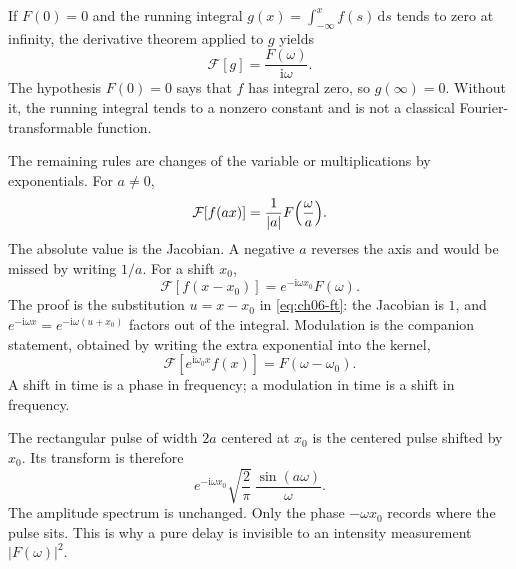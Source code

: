 If $F(0)=0$ and the running integral $g(x)=\int_{-\infty}^{x}f(s)\,\mathrm{d}s$ tends to zero at infinity, the derivative theorem applied to $g$ yields
\begin{equation}
\mathcal{F}[g]=\frac{F(\omega)}{\mathrm{i}\omega}.
\end{equation}
The hypothesis $F(0)=0$ says that $f$ has integral zero, so $g(\infty)=0$. Without it, the running integral tends to a nonzero constant and is not a classical Fourier-transformable function.

The remaining rules are changes of the variable or multiplications by exponentials. For $a\neq 0$,
\begin{equation}
\mathcal{F}[f(ax)]=\frac{1}{|a|}F\Bigl(\frac{\omega}{a}\Bigr).
\label{eq:ch06-similarity}
\end{equation}
The absolute value is the Jacobian. A negative $a$ reverses the axis and would be missed by writing $1/a$. For a shift $x_0$,
\begin{equation}
\mathcal{F}[f(x-x_0)]=e^{-\mathrm{i}\omega x_0}F(\omega).
\label{eq:ch06-delay}
\end{equation}
The proof is the substitution $u=x-x_0$ in \eqref{eq:ch06-ft}: the Jacobian is $1$, and $e^{-\mathrm{i}\omega x}=e^{-\mathrm{i}\omega(u+x_0)}$ factors out of the integral. Modulation is the companion statement, obtained by writing the extra exponential into the kernel,
\begin{equation}
\mathcal{F}[e^{\mathrm{i}\omega_0 x}f(x)]=F(\omega-\omega_0).
\end{equation}
A shift in time is a phase in frequency; a modulation in time is a shift in frequency.

\begin{example}
The rectangular pulse of width $2a$ centered at $x_0$ is the centered pulse shifted by $x_0$. Its transform is therefore
\begin{equation}
e^{-\mathrm{i}\omega x_0}\sqrt{\frac{2}{\pi}}\,\frac{\sin(a\omega)}{\omega}.
\end{equation}
The amplitude spectrum is unchanged. Only the phase $-\omega x_0$ records where the pulse sits. This is why a pure delay is invisible to an intensity measurement $|F(\omega)|^2$.
\end{example}

